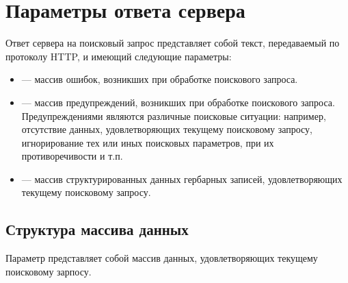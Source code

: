 \documentclass[letterpaper,10pt,russian]{sphinxmanual}
\begin{document}
\section{Параметры ответа сервера}
\label{\detokenize{http_api:id5}}\label{\detokenize{http_api:index-2}}
Ответ сервера на поисковый запрос представляет собой  текст, передаваемый по протоколу HTTP, и имеющий следующие параметры:
\begin{itemize}
\item {} 
 — массив ошибок, возникших при обработке поискового запроса.

\item {} 
 — массив предупреждений, возникших при обработке поискового запроса. Предупреждениями являются различные поисковые ситуации: например, отсутствие данных, удовлетворяющих текущему поисковому запросу, игнорирование тех или иных поисковых параметров, при их противоречивости и т.п.

\item {} 
 — массив структурированных данных гербарных записей, удовлетворяющих текущему поисковому запросу.

\end{itemize}

\ignorespaces 

\subsection{Структура массива данных}
\label{\detokenize{http_api:index-3}}\label{\detokenize{http_api:id6}}
Параметр  представляет собой массив данных, удовлетворяющих текущему поисковому зарпосу.
\end{document}
